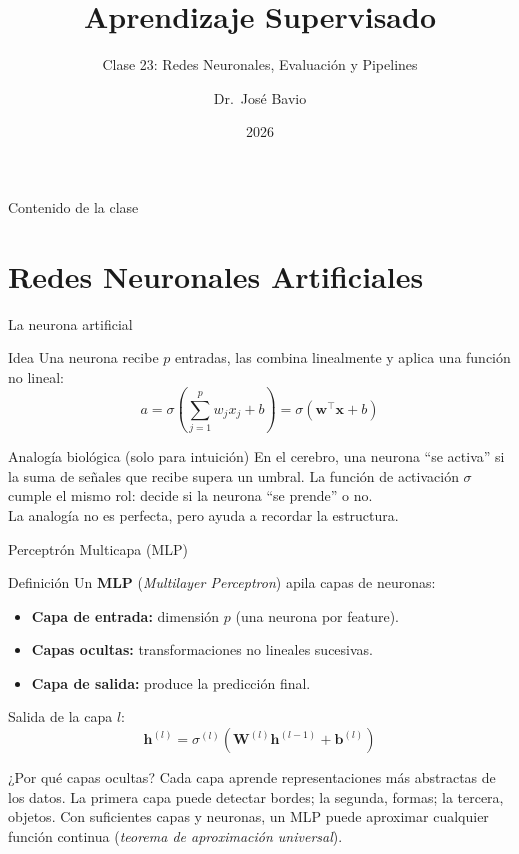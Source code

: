 \documentclass[aspectratio=169]{beamer}
\title[MAD1 -- Unidad 4]{Aprendizaje Supervisado}
\subtitle{Clase 23: Redes Neuronales, Evaluación y Pipelines}
\author[J. Bavio]{Dr.\ José Bavio}
\institute[UNS]{Departamento de Matemática\\Universidad Nacional del Sur}
\date{2026}
\newcommand{\bx}{\bm{x}}
\begin{document}
\begin{frame}
  \titlepage
\end{frame}

\begin{frame}{Contenido de la clase}
  \tableofcontents
\end{frame}

\section{Redes Neuronales Artificiales}

\begin{frame}{La neurona artificial}
  \begin{block}{Idea}
    Una neurona recibe $p$ entradas, las combina linealmente y aplica una función no lineal:
    \[
      a = \sigma\!\left(\sum_{j=1}^{p} w_j x_j + b\right) = \sigma(\bm{w}^\top \bx + b)
    \]
  \end{block}

  \medskip
  \begin{exampleblock}{Analogía biológica (solo para intuición)}
    En el cerebro, una neurona ``se activa'' si la suma de señales que recibe supera un umbral.
    La función de activación $\sigma$ cumple el mismo rol: decide si la neurona ``se prende'' o no.\\[4pt]
    La analogía no es perfecta, pero ayuda a recordar la estructura.
  \end{exampleblock}
\end{frame}

\begin{frame}{Perceptrón Multicapa (MLP)}
  \begin{block}{Definición}
    Un \textbf{MLP} (\textit{Multilayer Perceptron}) apila capas de neuronas:
    \begin{itemize}
      \item \textbf{Capa de entrada:} dimensión $p$ (una neurona por feature).
      \item \textbf{Capas ocultas:} transformaciones no lineales sucesivas.
      \item \textbf{Capa de salida:} produce la predicción final.
    \end{itemize}
  \end{block}

  \medskip
  Salida de la capa $l$:
  \[
    \bm{h}^{(l)} = \sigma^{(l)}\!\left(\bm{W}^{(l)} \bm{h}^{(l-1)} + \bm{b}^{(l)}\right)
  \]

  \begin{exampleblock}{¿Por qué capas ocultas?}
    Cada capa aprende representaciones más abstractas de los datos.
    La primera capa puede detectar bordes; la segunda, formas; la tercera, objetos.
    Con suficientes capas y neuronas, un MLP puede aproximar cualquier función continua
    (\textit{teorema de aproximación universal}).
  \end{exampleblock}
\end{frame}
\end{document}
